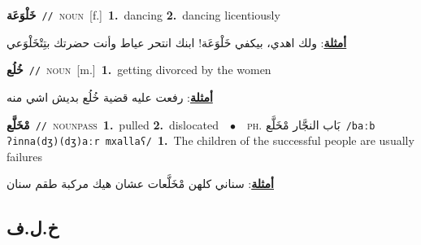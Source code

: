 \documentclass[10pt,a4paper,twoside]{article} %
\begin{document}
\begin{multicols}{2}
{\setlength\topsep{0pt}\textbf{\foreignlanguage{arabic}{خَلْوَعَة}}\ {\color{gray}\texttt{//}\color{black}}\ \textsc{noun}\ [f.]\ \textbf{1.}~dancing  \textbf{2.}~dancing licentiously\  \begin{flushright}\color{gray}\foreignlanguage{arabic}{\textbf{\underline{\foreignlanguage{arabic}{أمثلة}}}: ولك اهدي، بيكفي خَلْوَعَة! ابنك انتحر عياط وأنت حضرتك بتِتْخَلْوَعي}\end{flushright}\color{black}} \vspace{2mm}

{\setlength\topsep{0pt}\textbf{\foreignlanguage{arabic}{خُلُع}}\ {\color{gray}\texttt{//}\color{black}}\ \textsc{noun}\ [m.]\ \textbf{1.}~getting divorced by the women\  \begin{flushright}\color{gray}\foreignlanguage{arabic}{\textbf{\underline{\foreignlanguage{arabic}{أمثلة}}}: رفعت عليه قضية خُلُع بديش اشي منه}\end{flushright}\color{black}} \vspace{2mm}

{\setlength\topsep{0pt}\textbf{\foreignlanguage{arabic}{مْخَلَّع}}\ {\color{gray}\texttt{//}\color{black}}\ \textsc{noun\textunderscore pass}\ \textbf{1.}~pulled  \textbf{2.}~dislocated\ \ $\bullet$\ \ \textsc{ph.} \color{gray} \foreignlanguage{arabic}{بَاب النجَّار مْخَلَّع}\color{black}\ {\color{gray}\texttt{/{\sffamily baːb ʔinna(dʒ)(dʒ)aːr mxallaʕ}/}\color{black}}\ \textbf{1.}~The children of the successful people are usually failures\  \begin{flushright}\color{gray}\foreignlanguage{arabic}{\textbf{\underline{\foreignlanguage{arabic}{أمثلة}}}: سناني كلهن مْخَلَّعات عشان هيك مركبة طقم سنان}\end{flushright}\color{black}} \vspace{2mm}

\vspace{-3mm}
\subsection*{\color{blue}\foreignlanguage{arabic}{خ.ل.ف}\color{blue}{}} 


\end{multicols}
\end{document}
